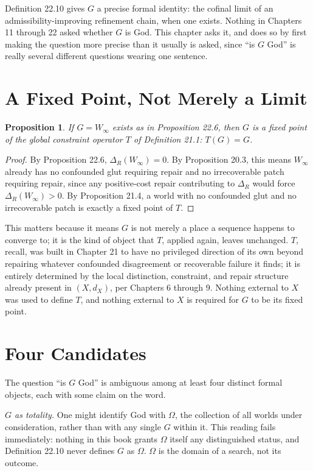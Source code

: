\documentclass[11pt]{book}
\newtheorem{proposition}[theorem]{Proposition}
\begin{document}
Definition 22.10 gives $G$ a precise formal identity: the cofinal limit of an admissibility-improving refinement chain, when one exists. Nothing in Chapters 11 through 22 asked whether $G$ is God. This chapter asks it, and does so by first making the question more precise than it usually is asked, since ``is $G$ God'' is really several different questions wearing one sentence.

\section{A Fixed Point, Not Merely a Limit}

\begin{proposition}
If $G = W_\infty$ exists as in Proposition 22.6, then $G$ is a fixed point of the global constraint operator $T$ of Definition 21.1: $T(G) = G$.
\end{proposition}

\begin{proof}
By Proposition 22.6, $\Delta_R(W_\infty) = 0$. By Proposition 20.3, this means $W_\infty$ already has no confounded glut requiring repair and no irrecoverable patch requiring repair, since any positive-cost repair contributing to $\Delta_R$ would force $\Delta_R(W_\infty) > 0$. By Proposition 21.4, a world with no confounded glut and no irrecoverable patch is exactly a fixed point of $T$.
\end{proof}

This matters because it means $G$ is not merely a place a sequence happens to converge to; it is the kind of object that $T$, applied again, leaves unchanged. $T$, recall, was built in Chapter 21 to have no privileged direction of its own beyond repairing whatever confounded disagreement or recoverable failure it finds; it is entirely determined by the local distinction, constraint, and repair structure already present in $(X, d_X)$, per Chapters 6 through 9. Nothing external to $X$ was used to define $T$, and nothing external to $X$ is required for $G$ to be its fixed point.

\section{Four Candidates}

The question ``is $G$ God'' is ambiguous among at least four distinct formal objects, each with some claim on the word.

\emph{$G$ as totality.} One might identify God with $\Omega$, the collection of all worlds under consideration, rather than with any single $G$ within it. This reading fails immediately: nothing in this book grants $\Omega$ itself any distinguished status, and Definition 22.10 never defines $G$ as $\Omega$. $\Omega$ is the domain of a search, not its outcome.
\end{document}
